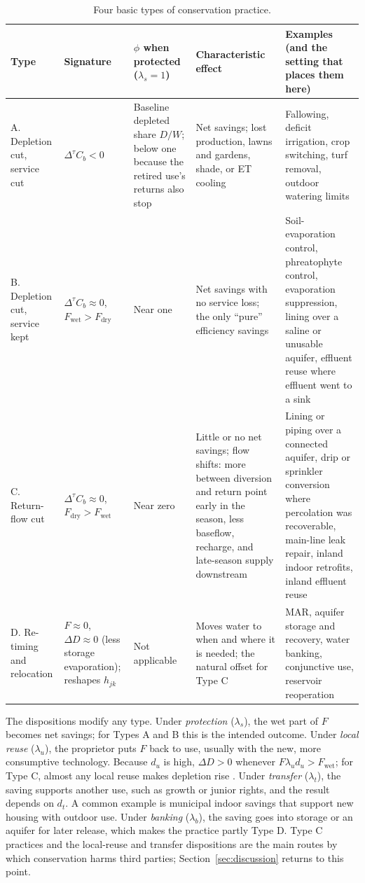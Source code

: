 \documentclass[11pt]{article}
\newcommand{\Cb}{C_b}                       %
\newcommand{\Fwet}{F_{\mathrm{wet}}}        %
\newcommand{\Fdry}{F_{\mathrm{dry}}}        %
\newcommand{\dtau}{\Delta^{\tau}}            %
\begin{document}
\begin{table}[htbp]
\centering
\caption{Four basic types of conservation practice.}\label{tab:types}
\footnotesize
\begin{tabularx}{\textwidth}{@{}P{2.3cm}P{2.1cm}P{2.4cm}LL@{}}
\toprule
Type & Signature & $\phi$ when protected ($\lambda_s = 1$) & Characteristic effect & Examples (and the setting that places them here) \\
\midrule
A. Depletion cut, service cut & $\dtau \Cb < 0$ & Baseline depleted share $D/W$; below one because the retired use's returns also stop & Net savings; lost production, lawns and gardens, shade, or ET cooling & Fallowing, deficit irrigation, crop switching, turf removal, outdoor watering limits \\
B. Depletion cut, service kept & $\dtau \Cb \approx 0$, $\Fwet > \Fdry$ & Near one & Net savings with no service loss; the only ``pure'' efficiency savings & Soil-evaporation control, phreatophyte control, evaporation suppression, lining over a saline or unusable aquifer, effluent reuse where effluent went to a sink \\
C. Return-flow cut & $\dtau \Cb \approx 0$, $\Fdry > \Fwet$ & Near zero & Little or no net savings; flow shifts: more between diversion and return point early in the season, less baseflow, recharge, and late-season supply downstream & Lining or piping over a connected aquifer, drip or sprinkler conversion where percolation was recoverable, main-line leak repair, inland indoor retrofits, inland effluent reuse \\
D. Re-timing and relocation & $F \approx 0$, $\Delta D \approx 0$ (less storage evaporation); reshapes $h_{jk}$ & Not applicable & Moves water to when and where it is needed; the natural offset for Type C & MAR, aquifer storage and recovery, water banking, conjunctive use, reservoir reoperation \\
\bottomrule
\end{tabularx}
\end{table}

The dispositions modify any type. Under \emph{protection} ($\lambda_s$), the wet part of $F$ becomes net savings; for Types A and B this is the intended outcome. Under \emph{local reuse} ($\lambda_u$), the proprietor puts $F$ back to use, usually with the new, more consumptive technology. Because $d_u$ is high, $\Delta D > 0$ whenever $F \lambda_u d_u > \Fwet$; for Type C, almost any local reuse makes depletion rise \citep{ward2008}. Under \emph{transfer} ($\lambda_t$), the saving supports another use, such as growth or junior rights, and the result depends on $d_t$. A common example is municipal indoor savings that support new housing with outdoor use. Under \emph{banking} ($\lambda_b$), the saving goes into storage or an aquifer for later release, which makes the practice partly Type D. Type C practices and the local-reuse and transfer dispositions are the main routes by which conservation harms third parties; Section~\ref{sec:discussion} returns to this point.
\end{document}
